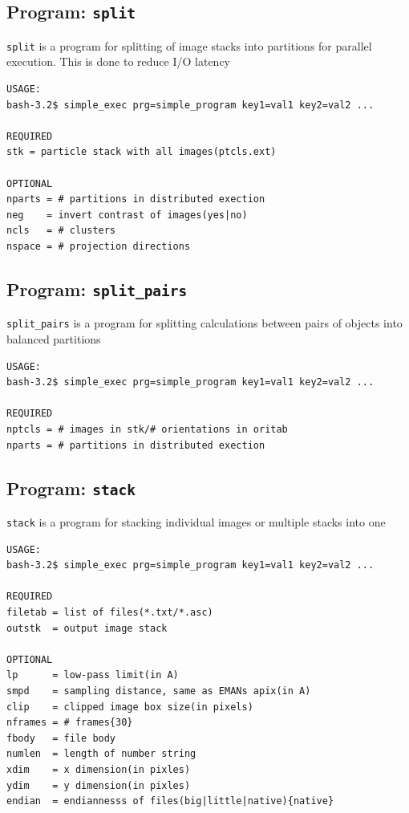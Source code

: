 \documentclass[a4paper,11pt]{article}
\newcommand{\prgname}[1]{\textcolor{NavyBlue}{\texttt{#1}}}
\begin{document}
\subsection{Program: \prgname{split}}
\label{split}
\prgname{split} is a program for splitting of image stacks into partitions for parallel execution. This is done to reduce I/O latency

\begin{verbatim}
USAGE:
bash-3.2$ simple_exec prg=simple_program key1=val1 key2=val2 ...

REQUIRED
stk = particle stack with all images(ptcls.ext)

OPTIONAL
nparts = # partitions in distributed exection
neg    = invert contrast of images(yes|no)
ncls   = # clusters
nspace = # projection directions
\end{verbatim}

\subsection{Program: \prgname{split\_pairs}}
\label{split_pairs}
\prgname{split\_pairs} is a program for splitting calculations between pairs of objects into balanced partitions

\begin{verbatim}
USAGE:
bash-3.2$ simple_exec prg=simple_program key1=val1 key2=val2 ...

REQUIRED
nptcls = # images in stk/# orientations in oritab
nparts = # partitions in distributed exection
\end{verbatim}

\subsection{Program: \prgname{stack}}
\label{stack}
\prgname{stack} is a program for stacking individual images or multiple stacks into one

\begin{verbatim}
USAGE:
bash-3.2$ simple_exec prg=simple_program key1=val1 key2=val2 ...

REQUIRED
filetab = list of files(*.txt/*.asc)
outstk  = output image stack

OPTIONAL
lp      = low-pass limit(in A)
smpd    = sampling distance, same as EMANs apix(in A)
clip    = clipped image box size(in pixels)
nframes = # frames{30}
fbody   = file body
numlen  = length of number string
xdim    = x dimension(in pixles)
ydim    = y dimension(in pixles)
endian  = endiannesss of files(big|little|native){native}
\end{verbatim}
\end{document}
